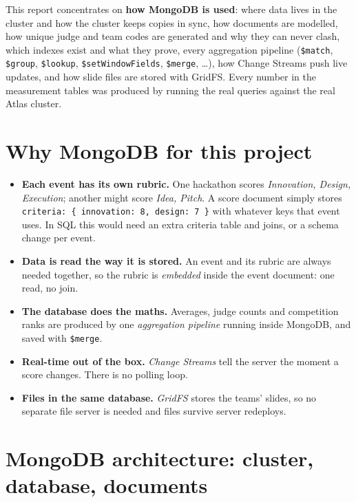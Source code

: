 \documentclass[11pt,a4paper]{article}
\newcommand{\op}[1]{\texttt{\$#1}}
\begin{document}
This report concentrates on \textbf{how MongoDB is used}: where data lives in the cluster and how the
cluster keeps copies in sync, how documents are modelled, how unique judge and team codes are generated and why they
can never clash, which indexes exist and what they prove, every aggregation pipeline (\op{match}, \op{group},
\op{lookup}, \op{setWindowFields}, \op{merge}, \dots), how Change Streams push live updates, and how slide files
are stored with GridFS. Every number in the measurement tables was produced by running the real queries against the
real Atlas cluster.

\tableofcontents
\newpage

\section{Why MongoDB for this project}

\begin{itemize}[leftmargin=1.4em]
  \item \textbf{Each event has its own rubric.} One hackathon scores \emph{Innovation, Design, Execution}; another
        might score \emph{Idea, Pitch}. A score document simply stores \texttt{criteria: \{ innovation: 8, design: 7 \}}
        with whatever keys that event uses. In SQL this would need an extra criteria table and joins, or a schema change
        per event.
  \item \textbf{Data is read the way it is stored.} An event and its rubric are always needed together, so the rubric
        is \emph{embedded} inside the event document: one read, no join.
  \item \textbf{The database does the maths.} Averages, judge counts and competition ranks are produced by one
        \emph{aggregation pipeline} running inside MongoDB, and saved with \op{merge}.
  \item \textbf{Real-time out of the box.} \emph{Change Streams} tell the server the moment a score changes. There is
        no polling loop.
  \item \textbf{Files in the same database.} \emph{GridFS} stores the teams' slides, so no separate file server is
        needed and files survive server redeploys.
\end{itemize}

\section{MongoDB architecture: cluster, database, documents}
\end{document}
